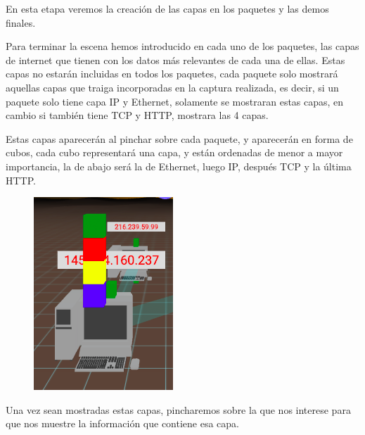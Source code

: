 \documentclass[a4paper, 12pt]{book}
\begin{document}
En esta etapa veremos la creación de las capas en los paquetes y las demos finales.

Para terminar la escena hemos introducido en cada uno de los paquetes, las capas de internet que tienen con los datos más relevantes de cada una de ellas. Estas capas no estarán incluidas en todos los paquetes, cada paquete solo mostrará aquellas capas que traiga incorporadas en la captura realizada, es decir, si un paquete solo tiene capa IP y Ethernet, solamente se mostraran estas capas, en cambio si también tiene TCP y HTTP, mostrara las 4 capas.

Estas capas aparecerán al pinchar sobre cada paquete, y aparecerán en forma de cubos, cada cubo representará una capa, y están ordenadas de menor a mayor importancia, la de abajo será la de Ethernet, luego IP, después TCP y la última HTTP.
\begin{figure}[h]
\centering
    \includegraphics[scale=0.5]{img/capas.png}
\end{figure}

Una vez sean mostradas estas capas, pincharemos sobre la que nos interese para que nos muestre la información que contiene esa capa.
\end{document}
